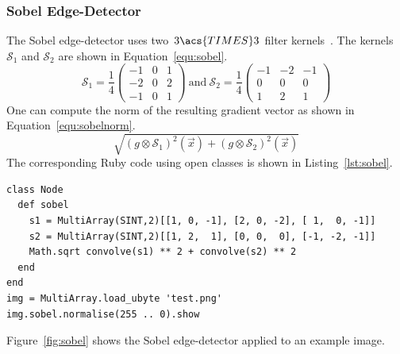 \documentclass[12pt,a4paper,oneside,openright]{book}
\newcommand{\equ}[1]{Equation~\ref{equ:#1}}
\newcommand{\fig}[1]{Figure~\ref{fig:#1}}
\newcommand{\lst}[1]{Listing~\ref{lst:#1}}
\begin{document}
\begin{CJK}{UTF8}{}
\subsubsection{Sobel Edge-Detector}
The Sobel edge-detector uses two $3\acs{TIMES} 3$ filter kernels~\citep{sobel}. The kernels $\mathcal{S}_1$ and $\mathcal{S}_2$ are shown in \equ{sobel}.
\begin{equation}\label{equ:sobel}
  \mathcal{S}_1=\displaystyle\frac{1}{4}
  \begin{pmatrix} -1 &  0 &  1 \\ -2 &  0 &  2 \\ -1 &  0 &  1 \end{pmatrix}
  \mathrm{\ and\ }
  \mathcal{S}_2=\displaystyle\frac{1}{4}
  \begin{pmatrix} -1 & -2 & -1 \\  0 &  0 &  0 \\  1 &  2 &  1 \end{pmatrix}
\end{equation}
One can compute the norm of the resulting gradient vector as shown in \equ{sobelnorm}.
\begin{equation}\label{equ:sobelnorm}
  \sqrt{(g\otimes\mathcal{S}_1)^2(\vec{x})+(g\otimes\mathcal{S}_2)^2(\vec{x})}
\end{equation}
The corresponding Ruby code using open classes is shown in \lst{sobel}.
\lstset{language=Ruby,frame=single,numbers=none}
\begin{lstlisting}[float,caption={Sobel edge-detector},escapechar=\$,label=lst:sobel]
class Node
  def sobel
    s1 = MultiArray(SINT,2)[[1, 0, -1], [2, 0, -2], [ 1,  0, -1]]
    s2 = MultiArray(SINT,2)[[1, 2,  1], [0, 0,  0], [-1, -2, -1]]
    Math.sqrt convolve(s1) ** 2 + convolve(s2) ** 2
  end
end
img = MultiArray.load_ubyte 'test.png'
img.sobel.normalise(255 .. 0).show
\end{lstlisting}
\fig{sobel} shows the Sobel edge-detector applied to an example image.
\begin{figure}[htbp]
   \begin{center}
     \begin{minipage}[t]{.45\textwidth}
     \end{minipage}
     \begin{minipage}[t]{.45\textwidth}

\end{minipage}
\end{center}
\end{figure}
\end{CJK}
\end{document}
